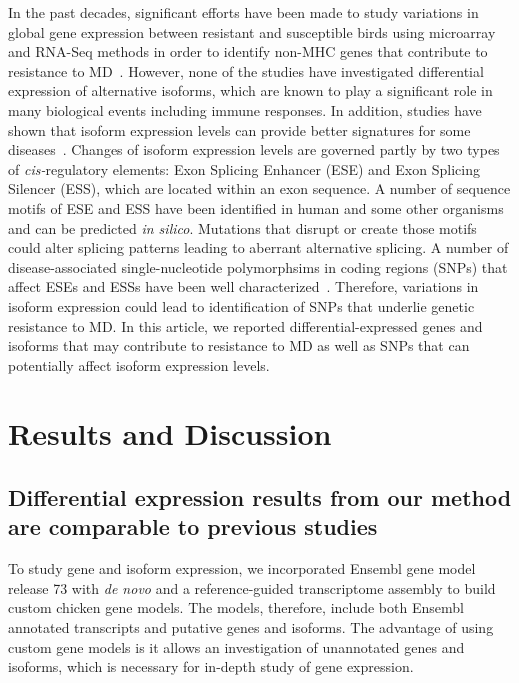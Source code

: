 In the past decades, significant efforts have been made to study
variations in global gene expression between resistant and
susceptible birds using microarray and RNA-Seq methods in order
to identify non-MHC genes that contribute to resistance to
MD~\cite{sarson2008transcriptional,morgan2001induction,vallejo1998genetic,yonash1999high,bumstead1998genomic}.
However, none of the studies have investigated differential
expression of alternative isoforms, which are known to play a
significant role in many biological events including immune
responses.  In addition, studies have shown that isoform
expression levels can provide better signatures for some
diseases~\cite{zhang2013isoform}.  Changes of isoform expression
levels are governed partly by two types of {\em cis-}regulatory
elements: Exon Splicing Enhancer (ESE) and Exon Splicing Silencer
(ESS), which are located within an exon sequence.  A number of
sequence motifs of ESE and ESS have been identified in human and
some other organisms and can be predicted {\em in silico}.
Mutations that disrupt or create those motifs could alter
splicing patterns leading to aberrant alternative splicing.  A
number of disease-associated single-nucleotide polymorphsims in
coding regions (SNPs) that affect ESEs and ESSs have been well
characterized~\cite{blencowe2000exonic, wang2007splicing}.
Therefore, variations in isoform expression could lead to
identification of SNPs that underlie genetic resistance to MD.
In this article, we reported differential-expressed genes and
isoforms that may contribute to resistance to MD as well as SNPs
that can potentially affect isoform expression levels.

\section{Results and Discussion}

\subsection{Differential expression results from our method are
comparable to previous studies}

To study gene and isoform expression, we incorporated Ensembl gene
model release 73 with {\em de novo} and a reference-guided
transcriptome assembly to build custom chicken gene models.  The
models, therefore, include both Ensembl annotated transcripts and
putative genes and isoforms.  The advantage of using custom
gene models is it allows an investigation of unannotated genes and
isoforms, which is necessary for in-depth study of gene expression.

